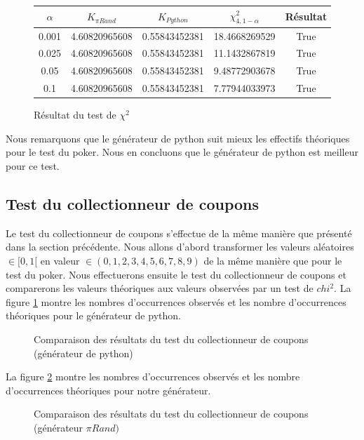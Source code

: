 \documentclass[10pt,a4paper]{article}
\begin{document}
\begin{figure}[H]
\begin{center}
\begin{tabular}{|c|c|c|c|c|}
\hline
$\alpha$ & $K_{\pi Rand}$ & $K_{Python}$ & $\chi^2_{4, 1 - \alpha}$ & Résultat\\
\hline
0.001 & 4.60820965608 & 0.55843452381 & 18.4668269529 & True\\
0.025 & 4.60820965608 & 0.55843452381 & 11.1432867819 & True\\
0.05 & 4.60820965608 & 0.55843452381 & 9.48772903678 & True\\
0.1 & 4.60820965608 & 0.55843452381 & 7.77944033973 & True\\
\hline
\end{tabular}
\end{center}
\caption{Résultat du test de $\chi^2$}
\end{figure}

Nous remarquons que le générateur de python suit mieux les effectifs théoriques pour le test du poker. Nous en concluons que le générateur de python est meilleur pour ce test.

\subsection{Test du collectionneur de coupons}
Le test du collectionneur de coupons s'effectue de la même manière que présenté dans la section précédente. Nous allons d'abord transformer les valeurs aléatoires $\in [0,1[$ en valeur $\in (0,1,2,3,4,5,6,7,8,9)$ de la même manière que pour le test du poker. Nous effectuerons ensuite le test du collectionneur de coupons et comparerons les valeurs théoriques aux valeurs observées par un test de $chi^2$. 
\newline
La figure \ref{couponshistocomp1} montre les nombres d'occurrences observés et les nombre d'occurrences théoriques pour le générateur de python.
\begin{figure}[H]
\caption{Comparaison des résultats du test du collectionneur de coupons (générateur de python)}
\label{couponshistocomp1}
\end{figure}
La figure \ref{couponshistocomp2} montre les nombres d'occurrences observés et les nombre d'occurrences théoriques pour notre générateur.
\begin{figure}[H]
\caption{Comparaison des résultats du test du collectionneur de coupons (générateur $\pi Rand)$}
\label{couponshistocomp2}
\end{figure}
\end{document}
